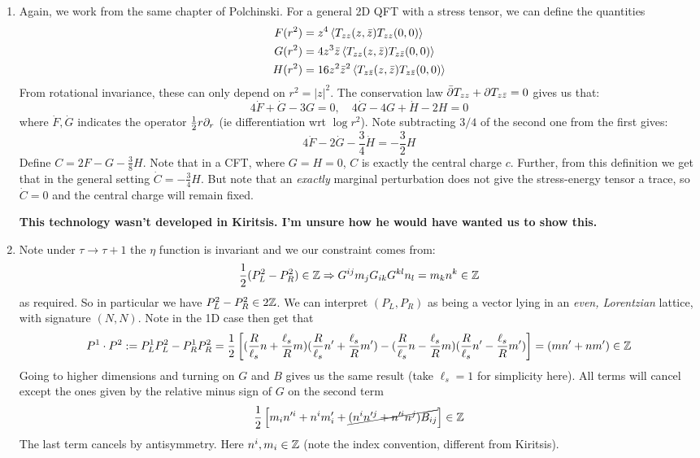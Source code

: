 \documentclass[11pt]{article}
\begin{document}
\begin{enumerate}
	\item Again, we work from the same chapter of Polchinski. For a general 2D QFT with a stress tensor, we can define the quantities
	\[
		\begin{aligned}
			F(r^2) &= z^4 \braket{T_{z z}(z, \bar z) T_{z z} (0, 0)}\\
			G(r^2) &= 4 z^3 \bar z \braket{T_{z z}(z, \bar z) T_{z \bar z} (0, 0)}\\
			H(r^2) &= 16 z^2 \bar z^2 \braket{T_{z \bar z}(z, \bar z) T_{z \bar z} (0, 0)}
		\end{aligned}
	\]
	From rotational invariance, these can only depend on $r^2 = |z|^2$. The conservation law $\bar {\partial} T_{zz} + \partial T_{z \bar z}= 0$ gives us that:
	\[
		4 \dot F + \dot G - 3 G = 0, \quad 4 \dot G - 4 G + \dot H - 2 H = 0
	\]
	where $\dot F, \dot G$ indicates the operator $\frac12 r \partial_r$ (ie differentiation wrt $\log r^2$). Note subtracting $3/4$ of the second one from the first gives:
	\[
		4 \dot F - 2 \dot G - \frac34 \dot H = -\frac{3}{2} H
	\]
	Define $C = 2 F - G - \frac38 H$. Note that in a CFT, where $G = H = 0$,  $C$ is exactly the central charge $c$. Further, from this definition we get that in the general setting $\dot C = -\frac34 H$. But note that an \emph{exactly} marginal perturbation does not give the stress-energy tensor a trace, so $\dot C = 0$ and the central charge will remain fixed.
	
	\textbf{This technology wasn't developed in Kiritsis. I'm unsure how he would have wanted us to show this.}
	
	\item Note under $\tau \to \tau+1$ the $\eta$ function is invariant and we our constraint comes from:
	\[
		\frac12 (P_L^2 - P_R^2) \in \mathbb{Z} \Rightarrow G^{ij} m_j G_{ik} G^{kl} n_l = m_k n^k \in \mathbb{Z}
	\]
	as required. So in particular we have $P_L^2 - P_R^2 \in 2 \mathbb{Z}$. We can interpret $(P_L, P_R)$ as being a vector lying in an \emph{even, Lorentzian} lattice, with signature $(N, N)$. Note in the 1D case then get that 
	\[
		P^1 \cdot P^2 := P^1_L P^2_L - P^1_R P^2_R = \frac12 \left[(\frac{R}{\ell_s} n + \frac{\ell_s}{R} m) (\frac{R}{\ell_s} n' + \frac{\ell_s}{R} m')
		 - (\frac{R}{\ell_s} n - \frac{\ell_s}{R} m) (\frac{R}{\ell_s} n' - \frac{\ell_s}{R} m') \right] = (m n' + n m') \in \mathbb{Z}
	\]
	Going to higher dimensions and turning on $G$ and $B$ gives us the same result (take $\ell_s = 1$ for simplicity here). All terms will cancel except the ones given by the relative minus sign of $G$ on the second term
	\[
		\frac12 \left[m_i n'^i + n^i m'_i + \cancel{(n^i n'^j + n'^i n^j )B_{ij}} \right] \in \mathbb{Z}
	\]
	The last term cancels by antisymmetry. Here $n^i, m_i \in \mathbb{Z}$ (note the index convention, different from Kiritsis). 
	

\end{enumerate}
\end{document}
